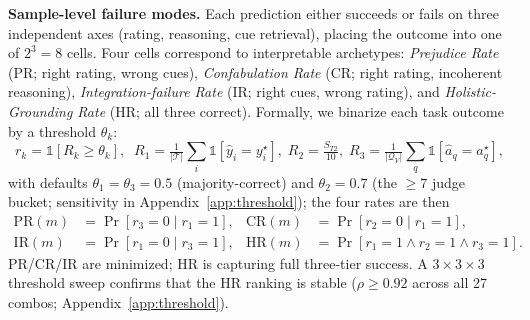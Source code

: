 \documentclass{llmxive}
\begin{document}
\vspace{-0.2cm}
\noindent\textbf{Sample-level failure modes.} Each prediction either succeeds or fails on three independent axes (rating, reasoning, cue retrieval), placing the outcome into one of $2^3\!=\!8$ cells. Four cells correspond to interpretable archetypes: \emph{Prejudice Rate} (PR; right rating, wrong cues), \emph{Confabulation Rate} (CR; right rating, incoherent reasoning), \emph{Integration-failure Rate} (IR; right cues, wrong rating), and \emph{Holistic-Grounding Rate} (HR; all three correct). Formally, we binarize each task outcome by a threshold $\theta_k$:
\vspace{-0.2cm}
\begin{equation}
r_k = \mathbb{1}[R_k \geq \theta_k],\;\;
R_1 = \tfrac{1}{|\mathcal{T}|}\sum_i \mathbb{1}[\hat{y}_i = y_i^\star],\;
R_2 = \tfrac{S_{T2}}{10},\;
R_3 = \tfrac{1}{|\mathcal{Q}_V|}\sum_q \mathbb{1}[\hat{a}_q = a_q^\star],
\label{eq:rk}
\end{equation}
with defaults $\theta_1{=}\theta_3{=}0.5$ (majority-correct) and $\theta_2{=}0.7$ (the $\geq\!7$ judge bucket; sensitivity in Appendix~\ref{app:threshold}); the four rates are then
\begin{align}
\text{PR}(m) &\!=\! \Pr[r_3\!=\!0\!\mid\! r_1\!=\!1], &
\text{CR}(m) &\!=\! \Pr[r_2\!=\!0\!\mid\! r_1\!=\!1], \label{eq:PR}\\[-1pt]
\text{IR}(m) &\!=\! \Pr[r_1\!=\!0\!\mid\! r_3\!=\!1], &
\text{HR}(m) &\!=\! \Pr[r_1\!=\!1 \!\wedge\! r_2\!=\!1 \!\wedge\! r_3\!=\!1]. \label{eq:HR}
\end{align}
PR/CR/IR are minimized; HR is capturing full three-tier success. 
A $3\!\times\!3\!\times\!3$ threshold sweep confirms that the HR ranking is stable ($\rho\!\geq\!0.92$ across all 27 combos; Appendix~\ref{app:threshold}).
\end{document}
